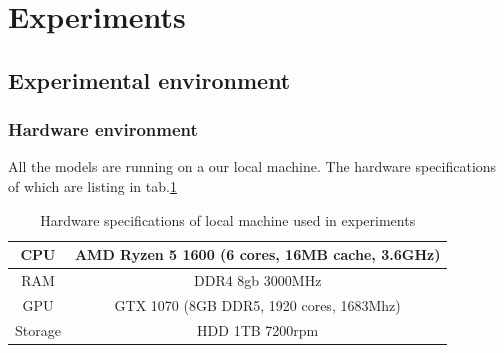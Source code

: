 \section{Experiments}
\subsection{Experimental environment}
\subsubsection{Hardware environment}
\hspace{0.45cm} All the models are running on a our local machine. The hardware specifications of which are listing in tab.\ref{tab:hardware_local}
\begin{table}[H]
\begin{center}
 \begin{tabular}{||c | c ||} 
 \hline
CPU & AMD Ryzen 5 1600 (6 cores, 16MB cache, 3.6GHz)\\
\hline
RAM & DDR4 8gb 3000MHz\\
\hline
GPU & GTX 1070 (8GB DDR5, 1920 cores, 1683Mhz) \\
\hline
Storage & HDD 1TB 7200rpm\\
 \hline
\end{tabular}
\end{center}
    \caption{Hardware specifications of local machine used in experiments}
    \label{tab:hardware_local}
\end{table}


